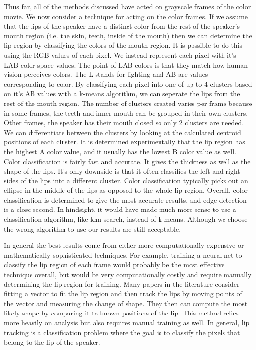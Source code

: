 \documentclass[a4paper]{article}
\begin{document}
Thus far, all of the methods discussed have acted on grayscale frames of the color movie. We now consider a technique for acting on the color frames. If we assume that the lips of the speaker have a distinct color from the rest of the speaker's mouth region (i.e. the skin, teeth, inside of the mouth) then we can determine the lip region by classifying the colors of the mouth region. It is possible to do this using the RGB values of each pixel. We instead represent each pixel with it's LAB color space values. The point of LAB colors  is that they match how human vision perceives colors. The L stands for lighting and AB are values corresponding to color. By classifying each pixel into one of up to 4 clusters based on it's AB values with a k-means algorithm, we can seperate the lips from the rest of the mouth region. The number of clusters created varies per frame because in some frames, the teeth and inner mouth can be grouped in their own clusters. Other frames, the speaker has their mouth closed so only 2 clusters are needed. We can differentiate between the clusters by looking at the calculated centroid positions of each cluster. It is determined experimentally that the lip region has the highest A color value, and it usually has the lowest B color value as well.  Color classification is fairly fast and accurate. It gives the thickness as well as the shape of the lips. It's only downside is that it often classifies the left and right sides of the lips into a different cluster. Color classification typically picks out an ellipse in the middle of the lips as opposed to the whole lip region. Overall, color classification is determined to give the most accurate results, and edge detection is a close second. In hindsight, it would have made much more sense to use a classification algorithm, like knn-search, instead of k-means. Although we choose the wrong algorithm to use our results are still acceptable. \par
In general the best results come from either more computationally expensive or mathematically sophisticated techniques. For example, training a neural net to classify the lip region of each frame would probably be the most effective technique overall, but would be very computationally costly and require manually determining the lip region for training. Many papers in the literature consider fitting a vector to fit the lip region and then track the lips by moving points of the vector and measuring the change of shape. They then can compute the most likely shape by comparing it to known positions of the lip. This method relies more heavily on analysis but also requires manual training as well. In general, lip tracking is a classification problem where the goal is to classify the pixels that belong to the lip of the speaker. 
\end{document}
